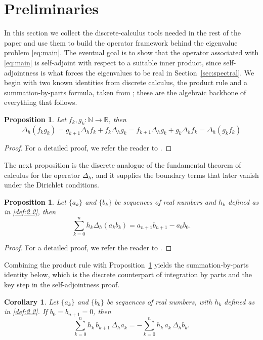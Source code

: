 \documentclass[12pt,reqno]{amsart}
\newtheorem{pro}[thm]{Proposition}
\newtheorem{cor}[thm]{Corollary}
\newcommand{\R}{\mathbb{R}}
\newcommand{\N}{\mathbb{N}}
\numberwithin{equation}{section}
\begin{document}
\section{Preliminaries}
\label{sec:prelim}
In this section we collect the discrete-calculus tools needed in the rest of the paper and use them to build the operator framework behind the eigenvalue problem \eqref{eq:main}. The eventual goal is to show that the operator associated with \eqref{eq:main} is self-adjoint with respect to a suitable inner product, since self-adjointness is what forces the eigenvalues to be real in Section~\ref{sec:spectral}. We begin with two known identities from discrete calculus, the product rule and a summation-by-parts formula, taken from \cite{Book KP}; these are the algebraic backbone of everything that follows.

\begin{pro}
Let \(f_k,g_k: \N \to \R\), then 
\begin{equation}
\label{pro: product rule}
\displaystyle \Delta_h \left(f_k g_k\right)=g_{k+1} \Delta_h f_k+f_k\Delta_h g_k  = f_{k+1} \Delta_h g_k+g_k\Delta_h f_k  = \displaystyle \Delta_h \left(g_k f_k\right)
\end{equation}
\end{pro}

\begin{proof}
For a detailed proof, we refer the reader to \cite[Pg. 15, Thm 2.1]{Book KP}.
\end{proof}

The next proposition is the discrete analogue of the fundamental theorem of calculus for the operator $\Delta_h$, and it supplies the boundary terms that later vanish under the Dirichlet conditions.

\begin{pro}
\label{pro:summation}
Let $\{a_k\}$ and $\{b_k\}$ be sequences of real numbers and $h_k$ defined as in \eqref{def:2.2}, then
\[
\sum_{k=0}^{n}h_k\Delta_h(a_kb_k) = a_{n+1}b_{n+1} - a_0b_0.
\]
\end{pro}
\begin{proof}
For a detailed proof, we refer the reader to \cite[Pg. 24, Thm 2.6(c,d)]{Book KP}.
\end{proof}

Combining the product rule with Proposition~\ref{pro:summation} yields the summation-by-parts identity below, which is the discrete counterpart of integration by parts and the key step in the self-adjointness proof.

\begin{cor}
\label{cor:summation}
Let $\{a_k\}$ and $\{b_k\}$ be sequences of real numbers, with $h_k$ defined as in \eqref{def:2.2}. If $b_0 = b_{n+1} = 0$, then
\[
\sum_{k=0}^{n} h_k\, b_{k+1}\, \Delta_h a_k = -\sum_{k=0}^{n} h_k\, a_k\, \Delta_h b_k.
\]
\end{cor}
\end{document}
